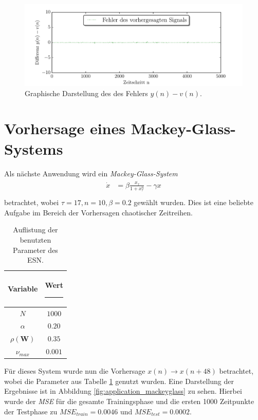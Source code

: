 \begin{figure}[H]
    \centering
    \includegraphics[width = 0.9 \textwidth]{figures/roessler_cross_err.pdf}
    \caption{Graphische Darstellung des des Fehlers $y(n)-v(n)$.}
    \label{fig:application_roessler_b2}
\end{figure}

\section{Vorhersage eines Mackey-Glass-Systems}
Als nächste Anwendung wird ein \textit{Mackey-Glass-System}
\begin{align}
\label{eq:application_roessler_pde}
\begin{split}
\dot{x} &= \beta \frac{x_\tau}{1+x_\tau^n}-\gamma x\\
\end{split}
\end{align}
betrachtet, wobei $\tau = 17, n=10, \beta = 0.2$ gewählt wurden. Dies ist eine beliebte Aufgabe im Bereich der Vorhersagen chaotischer Zeitreihen.

\begin{table}[H]
	\centering
		\begin{tabular}{|c|c|}
		\rule[-1ex]{0pt}{3.5ex} Variable & \hspace{4ex} Wert \rule[-1ex]{4ex}{0pt}\\ 
		\hline \hline 
		\rule[-1ex]{0pt}{3.5ex} $N$ & $1000$ \\ 
		\hline 
		\rule[-1ex]{0pt}{3.5ex} $\alpha$ & $0.20$ \\ 
		\hline 
		\rule[-1ex]{0pt}{3.5ex} $\rho(\mathbf{W})$ & $0.35$ \\ 
		\hline 
		\rule[-1ex]{0pt}{3.5ex} $\nu_{max}$ & $0.001$ \\ 
		\hline 
	\end{tabular} 
	\caption{Auflistung der benutzten Parameter des \textsc{ESN}.}
\label{tab:application_mackeyglass}
\end{table}

Für dieses System wurde nun die Vorhersage $x(n) \rightarrow x(n+48)$ betrachtet, wobei die Parameter aus Tabelle \ref{tab:application_mackeyglass} genutzt wurden. Eine Darstellung der Ergebnisse ist in Abbildung \ref{fig:application_mackeyglass} zu sehen. Hierbei wurde der \textit{MSE} für die gesamte Trainingsphase und die ersten 1000 Zeitpunkte der Testphase zu $MSE_{train} = 0.0046$ und $MSE_{test} = 0.0002$.

